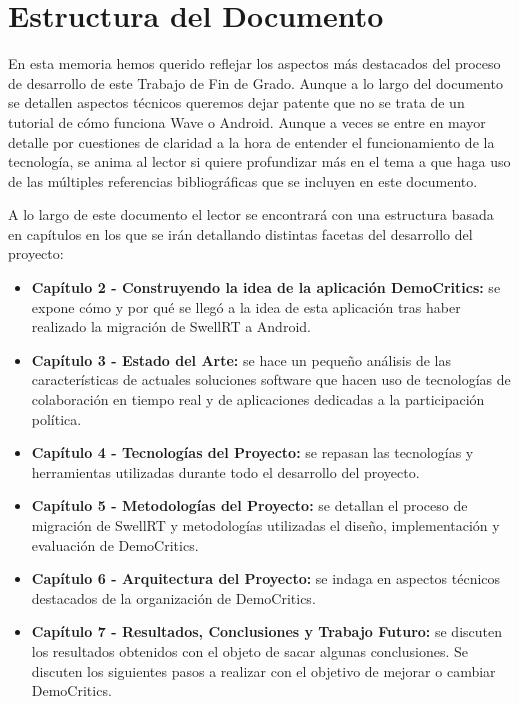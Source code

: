 \section{Estructura del Documento}

En esta memoria hemos querido reflejar los aspectos más destacados del proceso de desarrollo de este Trabajo de Fin de Grado. Aunque a lo largo del documento se detallen aspectos técnicos queremos dejar patente que no se trata de un tutorial de cómo funciona Wave o Android. Aunque a veces se entre en mayor detalle por cuestiones de claridad a la hora de entender el funcionamiento de la tecnología, se anima al lector si quiere profundizar más en el tema a que haga uso de las múltiples referencias bibliográficas que se incluyen en este documento.  

A lo largo de este documento el lector se encontrará con una estructura basada en capítulos en los que se irán detallando distintas facetas del desarrollo del proyecto: 

\begin{itemize}
  \item \textbf{Capítulo 2 - Construyendo la idea de la aplicación DemoCritics:} se expone cómo y por qué se llegó a la idea de esta aplicación tras haber realizado la migración de SwellRT a Android.
  \item \textbf{Capítulo 3 - Estado del Arte:} se hace un pequeño análisis de las características de actuales soluciones software que hacen uso de tecnologías de colaboración en tiempo real y de aplicaciones dedicadas a la participación política.
  \item \textbf{Capítulo 4 - Tecnologías del Proyecto:} se repasan las tecnologías y herramientas utilizadas durante todo el desarrollo del proyecto.
  \item \textbf{Capítulo 5 - Metodologías del Proyecto:} se detallan el proceso de migración de SwellRT y metodologías utilizadas el diseño, implementación y evaluación de DemoCritics.
  \item \textbf{Capítulo 6 - Arquitectura del Proyecto:} se indaga en aspectos técnicos destacados de la organización de DemoCritics.
  \item \textbf{Capítulo 7 - Resultados, Conclusiones y Trabajo Futuro:} se discuten los resultados obtenidos con el objeto de sacar algunas conclusiones. Se discuten los siguientes pasos a realizar con el objetivo  de mejorar o cambiar DemoCritics.
\end{itemize}
